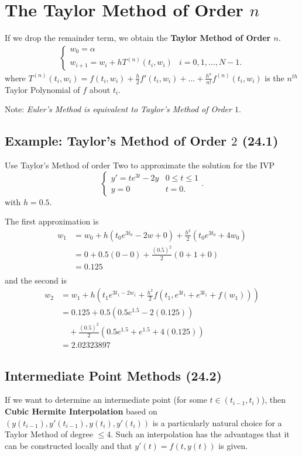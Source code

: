 \section{The Taylor Method of Order $n$}
If we drop the remainder term, we obtain the \textbf{Taylor Method of Order $n$}.
\begin{align*}
  \begin{cases}
    w_0 = \alpha & \\
    w_{i+1} = w_i + hT^{(n)}(t_i, w_i) & i = 0, 1, \dots, N-1
  .\end{cases}
\end{align*}
where $T^{(n)}(t_i, w_i) = f(t_i, w_i) + \frac{h}{2}f'(t_i, w_i) + \dots + 
\frac{h^n}{n!}f^{(n)}(t_i, w_i)$ is the $n^{th}$ Taylor Polynomial of $f$ about
$t_i$.

Note: \textit{Euler's Method is equivalent to Taylor's Method of Order $1$}.

\subsection{Example: Taylor's Method of Order $2$ (24.1)}
Use Taylor's Method of order Two to approximate the solution for the IVP 
\[
  \begin{cases}
    y' = te^{3t} - 2y & 0 \leq t \leq 1\\
    y = 0 & t = 0
  .\end{cases}
.\]
with $h=0.5$.

\soln The first approximation is 
\begin{align*}
  w_1 &= w_0 + h(t_0e^{3t_0}-2w+0) + \frac{h^2}{2}(t_0 e^{3t_0} + 4w_0) \\
      &= 0 + 0.5(0-0) + \frac{(0.5)^2}{2}(0+1+0) \\ 
      &= 0.125 \\
\end{align*}
and the second is 
\begin{align*}
  w_2 &= w_1 + h \left( t_1 e^{3t_1 - 2w_1} + \frac{h^2}{2} f\left(t_1, e^{3t_1} + e^{3t_1} + f(w_1)\right) \right) \\
      &= 0.125 + 0.5 \left( 0.5 e^{1.5} - 2(0.125) \right) \\
      &\quad + \frac{(0.5)^2}{2} \left( 0.5 e^{1.5} + e^{1.5} + 4(0.125) \right) \\
      &= 2.02323897
\end{align*}

\subsection{Intermediate Point Methods (24.2)}
If we want to determine an intermediate point (\eg for some
$t\in(t_{i-1},t_i)$), then \textbf{Cubic Hermite Interpolation} based on
$(y(t_{i-1}), y'(t_{i-1}), y(t_i), y'(t_i))$ is a particularly natural choice
for a Taylor Method of degree $\leq 4$. Such an interpolation has the advantages
that it can be constructed locally and that $y'(t) = f(t,y(t))$ is given.

